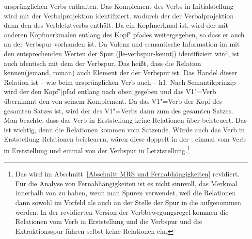 ursprünglichen Verbs  enthalten. Das Komplement des Verbs in Initialstellung  wird
mit der Verbalprojektion identifiziert, wodurch der \dslw der Verbalprojektion dann den \contw des
Verbletztverbs  enthält. Da \dsl ein Kopfmerkmal ist, wird der \dslw mit anderen
Kopfmerkmalen entlang des Kopf"|pfades weitergegeben, so dass er auch an der Verbspur vorhanden
ist. Da Valenz und semantische Information im \dslw mit den entsprechenden Werten der Spur (\ref{le-verbspur-kennt}) identifiziert wird, ist  auch identisch mit dem
\contw der Verbspur. Das heißt, dass die Relation kennen(jemand, roman) auch Element der
\relsl der Verbspur ist. Das Handel dieser Relation ist -- wie beim ursprünglichen Verb auch --
h1. Nach Semantikprinzip wird der \ltopw den Kopf"|pfad entlang nach oben gegeben und das V1"=Verb
übernimmt den \ltopw von seinem Komplement. Da das V1"=Verb der Kopf des gesamten Satzes ist, wird
der \ltopw des V1"=Verbs dann zum \ltopw des gesamten Satzes. Man beachte, dass das Verb in
Erststellung keine Relationen über \rels beisteuert. Das ist wichtig, denn die Relationen kommen vom
Satzende. Würde auch das Verb in Erststellung Relationen beisteuern, wären diese doppelt in der
\relsl: einmal vom Verb in Erststellung und einmal von der Verbspur in Letztstellung.\footnote{
  Das wird im Abschnitt~\ref{Abschnitt MRS und Fernabhängigkeiten} revidiert. Für die Analyse von
  Fernabhängigkeiten ist es nicht sinnvoll, das Merkmal \rels innerhalb von \cont zu haben, wenn man
  Spuren verwendet, weil die Relationen dann sowohl im Vorfeld als auch an der Stelle der Spur in
  die \relsl aufgenommen werden. In der revidierten Version der Verbbewegungsregel kommen die
  Relationen vom Verb in Erststellung und die Verbspur und die Extraktionsspur führen selbst keine
  Relationen ein.
}


